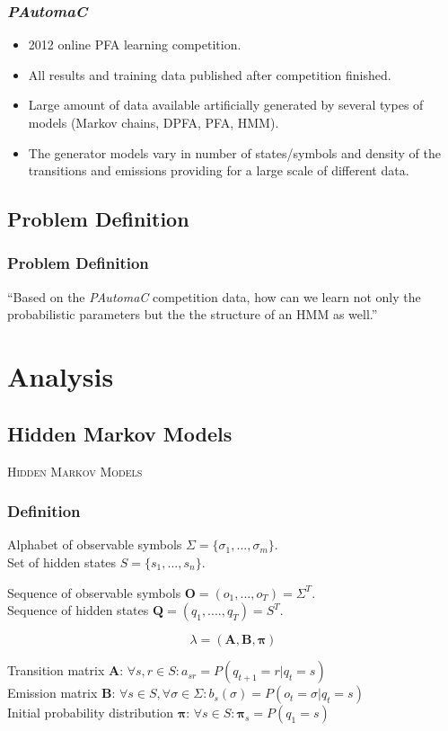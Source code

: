 \begin{frame}
	\frametitle{\emph{PAutomaC}}
	\begin{itemize}
		\item 2012 online PFA learning competition.
		\item All results and training data published after competition finished.
		\item Large amount of data available artificially generated by several types of models (Markov chains, DPFA, PFA, HMM).
		\item The generator models vary in number of states/symbols and density of the transitions and emissions providing for a large scale of different data.
	\end{itemize}
\end{frame}

\subsection{Problem Definition}

\begin{frame}
	\begin{center}
		\frametitle{Problem Definition}
		
		``Based on the \emph{PAutomaC} competition data, how can we learn not only the probabilistic parameters but the the structure of an HMM as well.''
	\end{center}
\end{frame}

\section{Analysis}
\subsection{Hidden Markov Models}

\begin{frame}
\center \huge \scshape Hidden Markov Models
\end{frame}

\begin{frame}
	\frametitle{Definition}
	
	Alphabet of observable symbols $\Sigma = \{\sigma_1, ..., \sigma_m\}$.\\
	Set of hidden states $S = \{s_1, ..., s_n\}$.
	
	Sequence of observable symbols $\mathbf{O}=(o_1,...,o_T)=\Sigma^T$.\\
	Sequence of hidden states $\mathbf{Q}=(q_1,....,q_T)=S^T$.
	
	$$\lambda=(\mathbf{A},\mathbf{B},\boldsymbol{\pi})$$
	
	Transition matrix $\mathbf{A}$: $\forall s,r\in S: a_{sr}=P(q_{t+1}=r|q_t=s)$\\
	Emission matrix $\mathbf{B}$: $\forall s\in S, \forall \sigma\in\Sigma: b_{s}(\sigma)=P(o_t=\sigma|q_t=s)$\\
	Initial probability distribution $\boldsymbol{\pi}$: $\forall s\in S:\boldsymbol{\pi}_s=P(q_1=s)$
\end{frame}

